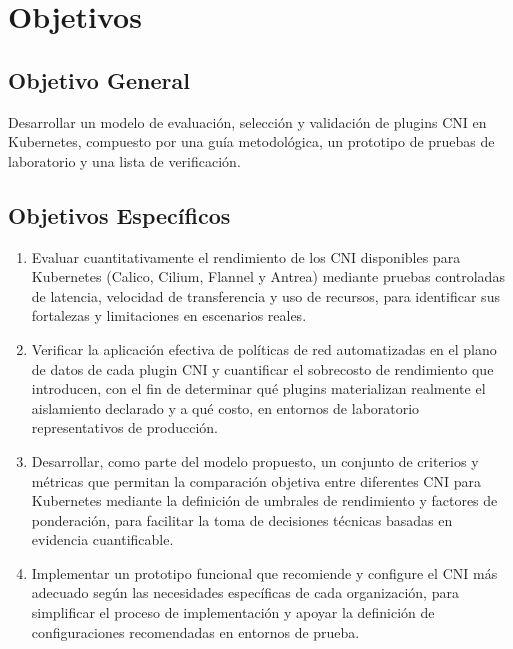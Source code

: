 \chapter{Objetivos} \label{sec:Objetivos}

\section{Objetivo General}

Desarrollar un modelo de evaluación, selección y validación de plugins CNI en Kubernetes, compuesto por una guía metodológica, un prototipo de pruebas de laboratorio y una lista de verificación.

\section{Objetivos Específicos}

\begin{enumerate}
  \item Evaluar cuantitativamente el rendimiento de los CNI disponibles para Kubernetes (Calico, Cilium, Flannel y Antrea) mediante pruebas controladas de latencia, velocidad de transferencia y uso de recursos, para identificar sus fortalezas y limitaciones en escenarios reales.
  \item Verificar la aplicación efectiva de políticas de red automatizadas en el plano de datos de cada plugin CNI y cuantificar el sobrecosto de rendimiento que introducen, con el fin de determinar qué plugins materializan realmente el aislamiento declarado y a qué costo, en entornos de laboratorio representativos de producción.
  \item Desarrollar, como parte del modelo propuesto, un conjunto de criterios y métricas que permitan la comparación objetiva entre diferentes CNI para Kubernetes mediante la definición de umbrales de rendimiento y factores de ponderación, para facilitar la toma de decisiones técnicas basadas en evidencia cuantificable.
  \item Implementar un prototipo funcional que recomiende y configure el CNI más adecuado según las necesidades específicas de cada organización, para simplificar el proceso de implementación y apoyar la definición de configuraciones recomendadas en entornos de prueba.
\end{enumerate}